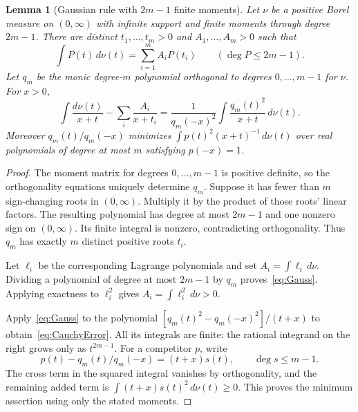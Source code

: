 \documentclass[11pt]{article}
\newtheorem{lemma}[theorem]{Lemma}
\numberwithin{equation}{section}
\begin{document}
\begin{lemma}[Gaussian rule with $2m-1$ finite moments]\label{lem:Gauss}
Let $\nu$ be a positive Borel measure on $(0,\infty)$ with infinite
support and finite moments through degree $2m-1$. There are distinct
$t_1,\ldots,t_m>0$ and $A_1,\ldots,A_m>0$ such that
\begin{equation}\label{eq:Gauss}
 \int P(t)\,d\nu(t)=\sum_{i=1}^m A_iP(t_i)
       \qquad(\deg P\le2m-1).
\end{equation}
Let $q_m$ be the monic degree-$m$ polynomial orthogonal to degrees
$0,\ldots,m-1$ for $\nu$. For $x>0$,
\begin{equation}\label{eq:CauchyError}
 \int\frac{d\nu(t)}{x+t}-\sum_i\frac{A_i}{x+t_i}
 =\frac1{q_m(-x)^2}\int\frac{q_m(t)^2}{x+t}\,d\nu(t).
\end{equation}
Moreover $q_m(t)/q_m(-x)$ minimizes
$\int p(t)^2(x+t)^{-1}\,d\nu(t)$ over real polynomials of degree at
most $m$ satisfying $p(-x)=1$.
\end{lemma}

\begin{proof}
The moment matrix for degrees $0,\ldots,m-1$ is positive definite,
so the orthogonality equations uniquely determine $q_m$. Suppose it
has fewer than $m$ sign-changing roots in $(0,\infty)$. Multiply it by
the product of those roots' linear factors. The resulting polynomial
has degree at most $2m-1$ and one nonzero sign on $(0,\infty)$.
Its finite integral is nonzero, contradicting orthogonality. Thus
$q_m$ has exactly $m$ distinct positive roots $t_i$.

Let $\ell_i$ be the corresponding Lagrange polynomials and set
$A_i=\int\ell_i\,d\nu$. Dividing a polynomial of degree at most
$2m-1$ by $q_m$ proves~\eqref{eq:Gauss}. Applying exactness to
$\ell_i^2$ gives $A_i=\int\ell_i^2\,d\nu>0$.

Apply~\eqref{eq:Gauss} to the polynomial
$[q_m(t)^2-q_m(-x)^2]/(t+x)$ to obtain~\eqref{eq:CauchyError}.
All its integrals are finite: the rational integrand on the right
grows only as $t^{2m-1}$. For a competitor $p$, write
\[
 p(t)-q_m(t)/q_m(-x)=(t+x)s(t),\qquad \deg s\le m-1.
\]
The cross term in the squared integral vanishes by orthogonality,
and the remaining added term is $\int(t+x)s(t)^2\,d\nu(t)\ge0$.
This proves the minimum assertion using only the stated moments.
\end{proof}
\end{document}

